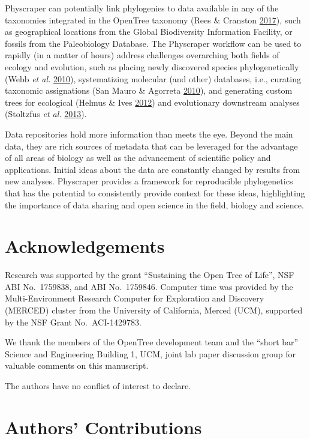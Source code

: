 \documentclass[]{article}
\begin{document}
Physcraper can potentially link phylogenies to data available in any of the taxonomies integrated in the OpenTree taxonomy (Rees \& Cranston \protect\hyperlink{ref-rees2017automated}{2017}), such as geographical locations from the Global Biodiversity Information Facility, or fossils from the Paleobiology Database.
The Physcraper workflow can be used to rapidly (in a matter of hours)
address challenges overarching both fields of ecology and evolution, such as
placing newly discovered species phylogenetically (Webb \emph{et al.} \protect\hyperlink{ref-webb2010biodiversity}{2010}),
systematizing molecular (and other) databases, i.e., curating taxonomic assignations (San Mauro \& Agorreta \protect\hyperlink{ref-san2010molecular}{2010}),
and generating custom trees for ecological (Helmus \& Ives \protect\hyperlink{ref-helmus2012phylogenetic}{2012}) and evolutionary downstream analyses (Stoltzfus \emph{et al.} \protect\hyperlink{ref-stoltzfus2013phylotastic}{2013}).

Data repositories hold more information than meets the eye.
Beyond the main data, they are rich sources of metadata that can be leveraged for the advantage of all areas of biology as well as the advancement of scientific policy and applications.
Initial ideas about the data are constantly changed by results from new analyses.
Physcraper provides a framework for reproducible phylogenetics that has the potential to consistently provide context for these ideas, highlighting the importance of data sharing and open science in the field, biology and science.

\hypertarget{acknowledgements}{%
\section{Acknowledgements}\label{acknowledgements}}

Research was supported by the grant ``Sustaining the Open Tree of Life'', NSF ABI No.~1759838, and ABI No.~1759846.
Computer time was provided by the Multi-Environment Research Computer for Exploration and Discovery (MERCED) cluster from the University of California, Merced (UCM), supported by the NSF Grant No.~ACI-1429783.

We thank the members of the OpenTree development team and the ``short bar'' Science and Engineering Building 1, UCM, joint lab paper discussion group for valuable comments on this manuscript.

The authors have no conflict of interest to declare.

\hypertarget{authors-contributions}{%
\section{Authors' Contributions}\label{authors-contributions}}
\end{document}

